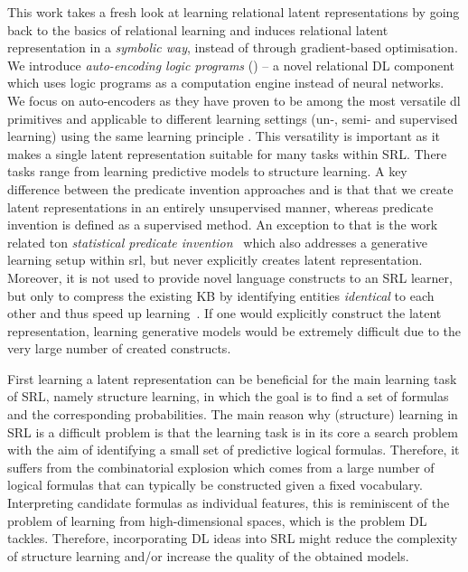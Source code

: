 This work takes a fresh look at learning relational latent representations by going back to the basics of relational learning and induces relational latent representation in a \textit{symbolic way}, instead of through gradient-based optimisation.
We introduce \textit{auto-encoding logic programs} () -- a novel relational DL component which uses logic programs as a computation engine instead of neural networks.
We focus on auto-encoders as they have proven to be among the most versatile \gls{dl} primitives and applicable to different learning settings (un-, semi- and supervised learning) using the same learning principle \cite{SSLVAE2014,VincentDaE,Kingma2014,BengioSAE}.
This versatility is important as it makes a single latent representation suitable for many tasks within SRL. 
There tasks range from learning predictive models to structure learning.
A key difference between the predicate invention approaches and  is that that we create latent representations in an entirely unsupervised manner, whereas predicate invention is defined as a supervised method.
An exception to that is the work related ton \textit{statistical predicate invention}~\cite{Kok2007} which also addresses a generative learning setup within \gls{srl}, but never explicitly creates latent representation.
Moreover, it is not used to provide novel language constructs to an SRL learner, but only to compress the existing KB by identifying entities \textit{identical} to each other and thus speed up learning~\cite{Kok:2009:LML:1553374.1553440}.
If one would explicitly construct the latent representation, learning generative models would be extremely difficult due to the very large number of created constructs.




First learning a latent representation can be beneficial for the main learning task of SRL, namely structure learning, in which the goal is to find a set of formulas and the corresponding probabilities. 
The main reason why (structure) learning in SRL is a difficult problem is that the learning task is in its core a search problem with the aim of identifying a small set of predictive logical formulas.
Therefore, it suffers from the combinatorial explosion which comes from a large number of logical formulas that can typically be constructed given a fixed vocabulary.
Interpreting candidate formulas as individual features, this is reminiscent of the problem of learning from high-dimensional spaces, which is the problem DL tackles.
Therefore, incorporating DL ideas into SRL might reduce the complexity of structure learning and/or increase the quality of the obtained models.


